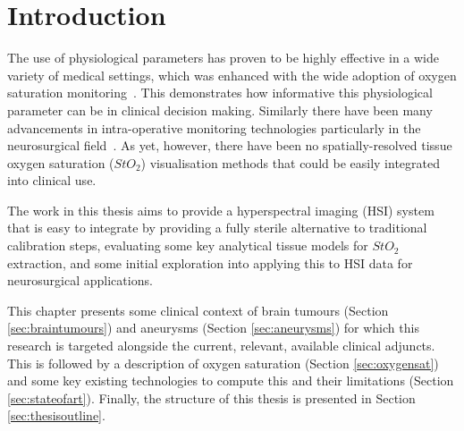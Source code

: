 \chapter{Introduction}
\label{chap:intro}
\minitoc

The use of physiological parameters has proven to be highly effective in a wide variety of medical settings, which was enhanced with the wide adoption of oxygen saturation monitoring~\cite{Williams2022}. This demonstrates how informative this physiological parameter can be in clinical decision making. Similarly there have been many advancements in intra-operative monitoring technologies particularly in the neurosurgical field~\cite{Raith2020}. As yet, however, there have been no spatially-resolved tissue oxygen saturation ($StO_2$) visualisation methods that could be easily integrated into clinical use. 

The work in this thesis aims to provide a hyperspectral imaging (HSI) system that is easy to integrate by providing a fully sterile alternative to traditional calibration steps, evaluating some key analytical tissue models for $StO_2$ extraction, and some initial exploration into applying this to HSI data for neurosurgical applications. 

This chapter presents some clinical context of brain tumours (Section \ref{sec:braintumours}) and aneurysms (Section \ref{sec:aneurysms}) for which this research is targeted alongside the current, relevant, available clinical adjuncts. This is followed by a description of oxygen saturation (Section \ref{sec:oxygensat}) and some key existing technologies to compute this and their limitations (Section \ref{sec:stateofart}). Finally, the structure of this thesis is presented in Section \ref{sec:thesisoutline}.

%
